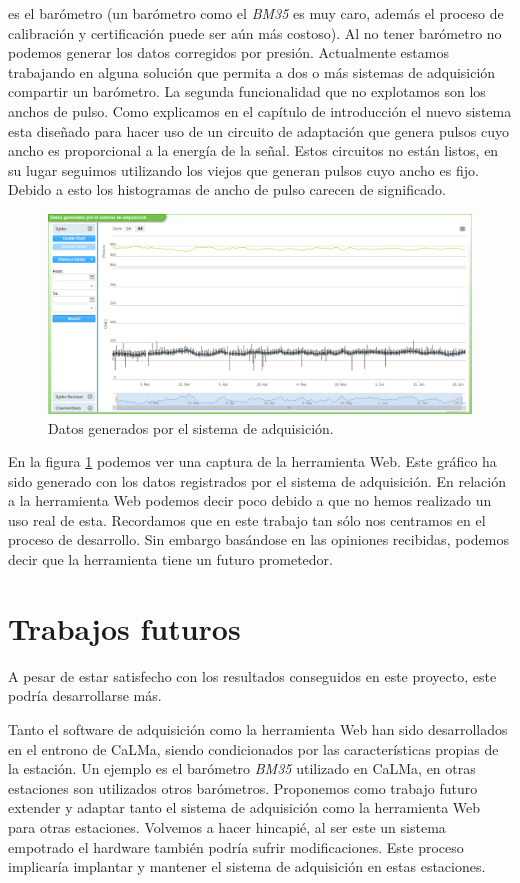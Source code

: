 	es el barómetro (un barómetro como el \emph{BM35} es muy caro, además el proceso de calibración y certificación puede ser aún más costoso). Al no
	tener barómetro no podemos generar los datos corregidos por presión. Actualmente estamos trabajando en alguna solución que permita a dos o más
	sistemas de adquisición compartir un barómetro. La segunda funcionalidad que no explotamos son los anchos de pulso. Como explicamos en el
	capítulo de introducción el nuevo sistema esta diseñado para hacer uso de un circuito de adaptación que genera pulsos cuyo ancho es
	proporcional a la energía de la señal. Estos circuitos no están listos, en su lugar seguimos utilizando los viejos que generan pulsos cuyo
	ancho es fijo. Debido a esto los histogramas de ancho de pulso carecen de significado. 
	\begin{figure}[h]
		\centering
		\includegraphics[keepaspectratio, width=1\textwidth]{./img/resultados.png}
		\caption{Datos generados por el sistema de adquisición.}   
		\label{fig:resultados}
	\end{figure}
	\par
	En la figura \ref{fig:resultados} podemos ver una captura de la herramienta Web. Este gráfico ha sido generado con los datos registrados por el
	sistema de adquisición. En relación a la herramienta Web podemos decir poco debido a que no hemos realizado un uso real de esta. Recordamos
	que en este trabajo tan sólo nos centramos en el proceso de desarrollo. Sin embargo basándose en las opiniones recibidas\cite{Poster}, podemos decir que la
	herramienta tiene un futuro prometedor.

\section{Trabajos futuros}
	A pesar de estar satisfecho con los resultados conseguidos en este proyecto, este podría desarrollarse más.
	\par
	Tanto el software de adquisición como la herramienta Web han sido desarrollados en el entrono de CaLMa, siendo condicionados por las
	características propias de la estación. Un ejemplo es el barómetro \emph{BM35} utilizado en CaLMa, en otras estaciones son utilizados otros
	barómetros. Proponemos como trabajo futuro extender y adaptar tanto el sistema de adquisición como la herramienta Web para otras estaciones.
	Volvemos a hacer hincapié, al ser este un sistema empotrado el hardware también podría sufrir modificaciones. Este proceso implicaría
	implantar y mantener el sistema de adquisición en estas estaciones.
